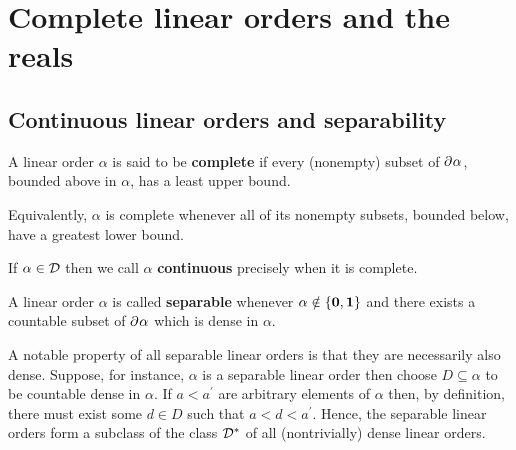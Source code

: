 
\chapter{Complete linear orders and the reals}

\section{Continuous linear orders and separability}

\begin{dfn}[Completeness]
	A linear order $\alpha$ is said to be \textbf{complete} if every (nonempty)
	subset of $\partial^{}{\alpha}$, bounded above in $\alpha$, has a least upper
	bound.
\end{dfn}

Equivalently, $\alpha$ is complete whenever all of its nonempty subsets, bounded
below, have a greatest lower bound.

\begin{dfn}
	If $\alpha\in\mathcal{D}$ then we call $\alpha$ \textbf{continuous} precisely when it is complete.
\end{dfn}

\begin{dfn}[Separable]
	A linear order $\alpha$ is called \textbf{separable} whenever
	$\alpha\notin\left\lbrace \mathbf{0},\mathbf{1}\right\rbrace$ and there exists a countable subset of
	$\partial^{}{}\alpha$ which is dense in $\alpha$.
\end{dfn}

A notable property of all separable linear orders is that they are necessarily
also dense.  Suppose, for instance, $\alpha$ is a separable linear order then
choose $D\subseteq\alpha$ to be countable dense in $\alpha$.  If $a<a^{\prime}$
are arbitrary elements of $\alpha$ then, by definition, there must exist some
$d\in D$ such that $a<d<a^{\prime}$.  Hence, the separable linear orders form a
subclass of the class $\mathcal{D}^\ast$ of all (nontrivially) dense linear orders.

